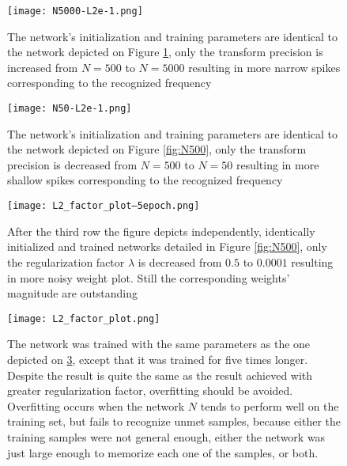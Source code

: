 \begin{figure}
	\centering
	\texttt{[image: N5000-L2e-1.png]}
	\caption{The network's initialization and training parameters are identical to the network depicted on Figure \ref{fig:N5000}, only the transform precision is increased from $N=500$ to $N=5000$ resulting in more narrow spikes corresponding to the recognized frequency}
	
	\label{fig:N5000}
\end{figure}


\begin{figure}
	\centering
	\texttt{[image: N50-L2e-1.png]}
	\caption{The network's initialization and training parameters are identical to the network depicted on Figure \ref{fig:N500}, only the transform precision is decreased from $N=500$ to $N=50$ resulting in more shallow spikes corresponding to the recognized frequency}
	
	\label{fig:N50}
\end{figure}

\begin{figure}
	\centering
	\texttt{[image: L2\_factor\_plot--5epoch.png]}
	\caption{After the third row the figure depicts independently, identically initialized and trained networks detailed in Figure \ref{fig:N500}, only the regularization factor $\lambda$ is decreased from $0.5$ to $0.0001$ resulting in more noisy weight plot. Still the  corresponding weights' magnitude are outstanding}
	
	\label{fig:reg}
\end{figure}

\begin{figure}
	\centering
	\texttt{[image: L2\_factor\_plot.png]}
	\caption{The network was trained with the same parameters as the one depicted on \ref{fig:reg}, except that it was trained for five times longer. Despite the result is quite the same as the result achieved with greater regularization factor, overfitting should be avoided. Overfitting occurs when the network $N$ tends to perform well on the training set, but fails to recognize unmet samples, because either the training samples were not general enough, either the network was just large enough to memorize each one of the samples, or both. }
	
	\label{fig:overtrain}
\end{figure}


